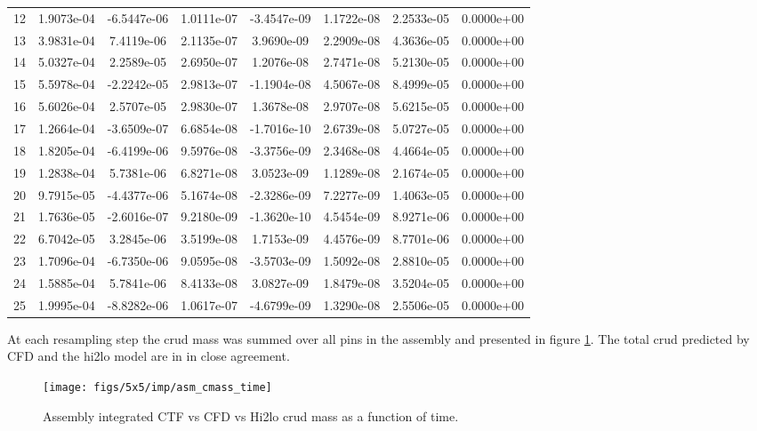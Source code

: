 \begin{table}[h]
\begin{center}
\begin{tabular}[h]{|c|c|c|c|c|c|c|c|}
12  & 1.9073e-04 & -6.5447e-06 & 1.0111e-07 & -3.4547e-09 & 1.1722e-08 & 2.2533e-05 & 0.0000e+00 \\
13  & 3.9831e-04 & 7.4119e-06 & 2.1135e-07 & 3.9690e-09 & 2.2909e-08 & 4.3636e-05 & 0.0000e+00 \\
14  & 5.0327e-04 & 2.2589e-05 & 2.6950e-07 & 1.2076e-08 & 2.7471e-08 & 5.2130e-05 & 0.0000e+00 \\
15  & 5.5978e-04 & -2.2242e-05 & 2.9813e-07 & -1.1904e-08 & 4.5067e-08 & 8.4999e-05 & 0.0000e+00 \\
16  & 5.6026e-04 & 2.5707e-05 & 2.9830e-07 & 1.3678e-08 & 2.9707e-08 & 5.6215e-05 & 0.0000e+00 \\
17  & 1.2664e-04 & -3.6509e-07 & 6.6854e-08 & -1.7016e-10 & 2.6739e-08 & 5.0727e-05 & 0.0000e+00 \\
18  & 1.8205e-04 & -6.4199e-06 & 9.5976e-08 & -3.3756e-09 & 2.3468e-08 & 4.4664e-05 & 0.0000e+00 \\
19  & 1.2838e-04 & 5.7381e-06 & 6.8271e-08 & 3.0523e-09 & 1.1289e-08 & 2.1674e-05 & 0.0000e+00 \\
20  & 9.7915e-05 & -4.4377e-06 & 5.1674e-08 & -2.3286e-09 & 7.2277e-09 & 1.4063e-05 & 0.0000e+00 \\
21  & 1.7636e-05 & -2.6016e-07 & 9.2180e-09 & -1.3620e-10 & 4.5454e-09 & 8.9271e-06 & 0.0000e+00 \\
22  & 6.7042e-05 & 3.2845e-06 & 3.5199e-08 & 1.7153e-09 & 4.4576e-09 & 8.7701e-06 & 0.0000e+00 \\
23  & 1.7096e-04 & -6.7350e-06 & 9.0595e-08 & -3.5703e-09 & 1.5092e-08 & 2.8810e-05 & 0.0000e+00 \\
24  & 1.5885e-04 & 5.7841e-06 & 8.4133e-08 & 3.0827e-09 & 1.8479e-08 & 3.5204e-05 & 0.0000e+00 \\
25  & 1.9995e-04 & -8.8282e-06 & 1.0617e-07 & -4.6799e-09 & 1.3290e-08 & 2.5506e-05 & 0.0000e+00 \\
\hline
\end{tabular}
\label{tab:loo_rms}
\end{center}
\end{table}

At each resampling step the crud mass was summed over all pins in the assembly and presented in figure \ref{fig:asmcmasstime}.  The total crud predicted by CFD and the hi2lo model are in in close agreement.

\begin{figure}[H]
    \centering
    \texttt{[image: figs/5x5/imp/asm\_cmass\_time]}
    \caption{Assembly integrated CTF vs CFD vs Hi2lo crud mass as a function of time.}
    \label{fig:asmcmasstime}
\end{figure}

